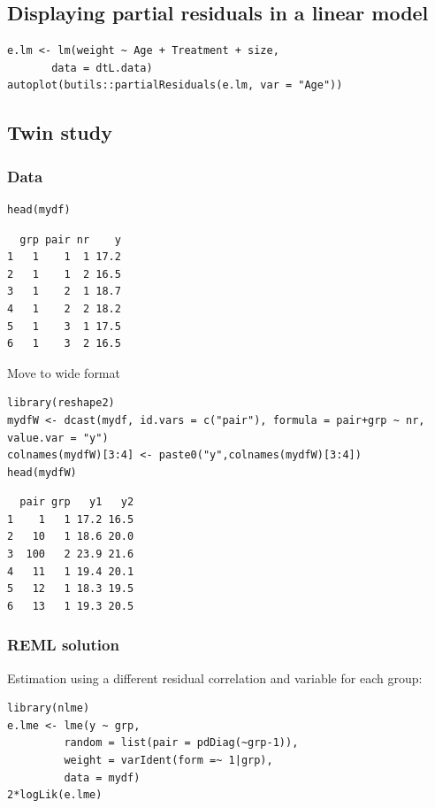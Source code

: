 \documentclass{article}
\begin{document}
\subsection{Displaying partial residuals in a linear model}
\label{sec:org6cfa803}
\lstset{language=r,label= ,caption= ,captionpos=b,numbers=none}
\begin{lstlisting}
e.lm <- lm(weight ~ Age + Treatment + size,
	   data = dtL.data)
autoplot(butils::partialResiduals(e.lm, var = "Age"))
\end{lstlisting}

\subsection{Twin study}
\label{sec:orgb0a232e}
\subsubsection{Data}
\label{sec:orgbd78101}

\lstset{language=r,label= ,caption= ,captionpos=b,numbers=none}
\begin{lstlisting}
head(mydf)
\end{lstlisting}
\begin{verbatim}
  grp pair nr    y
1   1    1  1 17.2
2   1    1  2 16.5
3   1    2  1 18.7
4   1    2  2 18.2
5   1    3  1 17.5
6   1    3  2 16.5
\end{verbatim}

Move to wide format
\lstset{language=r,label= ,caption= ,captionpos=b,numbers=none}
\begin{lstlisting}
library(reshape2)
mydfW <- dcast(mydf, id.vars = c("pair"), formula = pair+grp ~ nr, value.var = "y")
colnames(mydfW)[3:4] <- paste0("y",colnames(mydfW)[3:4])
head(mydfW)
\end{lstlisting}

\begin{verbatim}
  pair grp   y1   y2
1    1   1 17.2 16.5
2   10   1 18.6 20.0
3  100   2 23.9 21.6
4   11   1 19.4 20.1
5   12   1 18.3 19.5
6   13   1 19.3 20.5
\end{verbatim}

\subsubsection{REML solution}
\label{sec:orgd1e09be}
Estimation using a different residual correlation and variable for each group:
\lstset{language=r,label= ,caption= ,captionpos=b,numbers=none}
\begin{lstlisting}
library(nlme)
e.lme <- lme(y ~ grp,
	     random = list(pair = pdDiag(~grp-1)),
	     weight = varIdent(form =~ 1|grp),
	     data = mydf)
2*logLik(e.lme)
\end{lstlisting}
\end{document}
